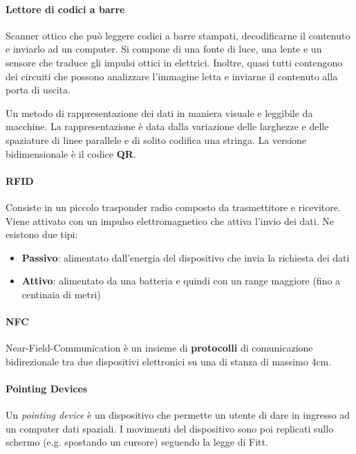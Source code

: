 \paragraph{Lettore di codici a barre} Scanner ottico che può leggere codici a barre stampati, decodificarne il contenuto e inviarlo ad un computer. Si compone di una fonte di luce, una lente e un sensore che traduce gli impulsi ottici in elettrici. Inoltre, quasi tutti contengono dei circuiti che possono analizzare l'immagine letta e inviarne il contenuto alla porta di uscita.
\begin{definition}
	Un metodo di rappresentazione dei dati in maniera visuale e leggibile da macchine. La rappresentazione è data dalla variazione delle larghezze e delle spaziature di linee parallele e di solito codifica una stringa. La versione bidimensionale è il codice \textbf{QR}.
\end{definition}

\paragraph{RFID} Consiste in un piccolo trasponder radio composto da trasmettitore e ricevitore. Viene attivato con un impulso elettromagnetico che attiva l'invio dei dati. Ne esistono due tipi:
\begin{itemize}
	\item \textbf{Passivo}: alimentato dall'energia del dispositivo che invia la richiesta dei dati
	\item \textbf{Attivo}: alimentato da una batteria e quindi con un range maggiore (fino a centinaia di metri)
\end{itemize}

\paragraph{NFC} Near-Field-Communication è un insieme di \textbf{protocolli} di comunicazione bidirezionale tra due dispositivi elettronici su una di stanza di massimo $4$cm.

\paragraph{Pointing Devices} Un \textit{pointing device} è un dispositivo che permette un utente di dare in ingresso ad un computer dati spaziali. I movimenti del dispositivo sono poi replicati sullo schermo (e.g. spostando un cursore) seguendo la legge di Fitt.

